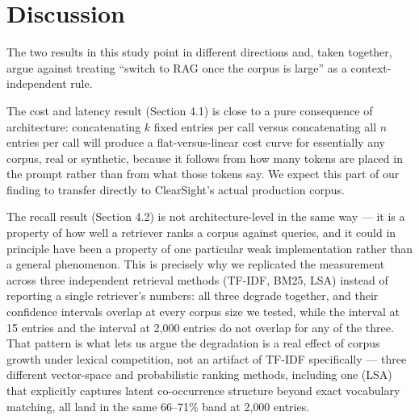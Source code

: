 \documentclass[11pt]{article}
\begin{document}
\section{Discussion}

The two results in this study point in different directions and, taken together, argue against treating ``switch to RAG once the corpus is large'' as a context-independent rule.

The cost and latency result (Section 4.1) is close to a pure consequence of architecture: concatenating $k$ fixed entries per call versus concatenating all $n$ entries per call will produce a flat-versus-linear cost curve for essentially any corpus, real or synthetic, because it follows from how many tokens are placed in the prompt rather than from what those tokens say. We expect this part of our finding to transfer directly to ClearSight's actual production corpus.

The recall result (Section 4.2) is not architecture-level in the same way --- it is a property of how well a retriever ranks a corpus against queries, and it could in principle have been a property of one particular weak implementation rather than a general phenomenon. This is precisely why we replicated the measurement across three independent retrieval methods (TF-IDF, BM25, LSA) instead of reporting a single retriever's numbers: all three degrade together, and their confidence intervals overlap at every corpus size we tested, while the interval at 15 entries and the interval at 2{,}000 entries do not overlap for any of the three. That pattern is what lets us argue the degradation is a real effect of corpus growth under lexical competition, not an artifact of TF-IDF specifically --- three different vector-space and probabilistic ranking methods, including one (LSA) that explicitly captures latent co-occurrence structure beyond exact vocabulary matching, all land in the same 66--71\% band at 2{,}000 entries.
\end{document}
